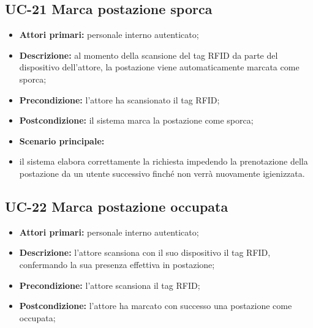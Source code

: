 \subsection{UC-21 Marca postazione sporca}

\begin{itemize}
\item \textbf{Attori primari:} personale interno autenticato;
\item \textbf{Descrizione:} al momento della scansione del tag RFID da parte del dispositivo dell'attore, la postazione viene automaticamente marcata come sporca;
\item \textbf{Precondizione:} l'attore ha scansionato il tag RFID; 
\item \textbf{Postcondizione:} il sistema marca la postazione come sporca;
\item \textbf{Scenario principale:} 
		\item il sistema elabora correttamente la richiesta impedendo la prenotazione della postazione da un utente successivo finché non verrà nuovamente igienizzata.
\end{itemize}


\newpage

\subsection{UC-22 Marca postazione occupata}

\begin{itemize}
\item \textbf{Attori primari:} personale interno autenticato;
\item \textbf{Descrizione:} l'attore scansiona con il suo dispositivo il tag RFID, confermando la sua presenza effettiva in postazione;
\item \textbf{Precondizione:} l'attore scansiona il tag RFID;
\item \textbf{Postcondizione:} l'attore ha marcato con successo una postazione come occupata;
\end{itemize}


